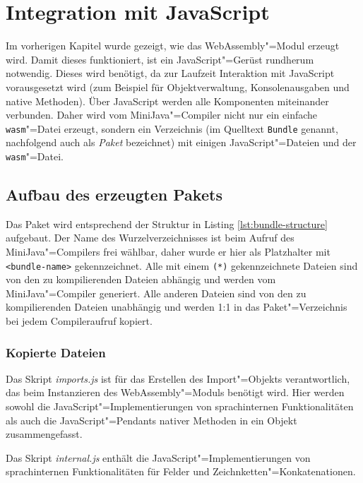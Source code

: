 \chapter{Integration mit JavaScript}
\label{cha:JavaScript-Integration}

Im vorherigen Kapitel wurde gezeigt, wie das WebAssembly"=Modul erzeugt wird.
Damit dieses funktioniert, ist ein JavaScript"=Gerüst rundherum notwendig. Dieses wird benötigt, da zur Laufzeit Interaktion mit JavaScript vorausgesetzt wird (zum Beispiel für Objektverwaltung, Konsolenausgaben und native Methoden). Über JavaScript werden alle Komponenten miteinander verbunden. Daher wird vom MiniJava"=Compiler nicht nur ein einfache \lstinline{wasm}"=Datei erzeugt, sondern ein Verzeichnis (im Quelltext \lstinline{Bundle} genannt, nachfolgend auch als \emph{Paket} bezeichnet) mit einigen JavaScript"=Dateien und der \lstinline{wasm}"=Datei.

\section{Aufbau des erzeugten Pakets}

Das Paket wird entsprechend der Struktur in Listing \ref{lst:bundle-structure} aufgebaut. Der Name des Wurzelverzeichnisses ist beim Aufruf des MiniJava"=Compilers frei wählbar, daher wurde er hier als Platzhalter mit \lstinline{<bundle-name>} gekennzeichnet. Alle mit einem \lstinline{(*)} gekennzeichnete Dateien sind von den zu kompilierenden Dateien abhängig und werden vom MiniJava"=Compiler generiert. Alle anderen Dateien sind von den zu kompilierenden Dateien unabhängig und werden 1:1 in das Paket"=Verzeichnis bei jedem Compileraufruf kopiert.



\subsection{Kopierte Dateien}

Das Skript \emph{imports.js} ist für das Erstellen des Import"=Objekts verantwortlich, das beim Instanzieren des WebAssembly"=Moduls benötigt wird. Hier werden sowohl die JavaScript"=Implementierungen von sprachinternen Funktionalitäten als auch die JavaScript"=Pendants nativer Methoden in ein Objekt zusammengefasst.

Das Skript \emph{internal.js} enthält die JavaScript"=Implementierungen von sprachinternen Funktionalitäten für Felder und Zeichnketten"=Konkatenationen.

